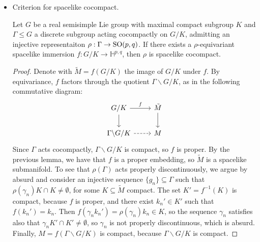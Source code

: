\documentclass{report}
\begin{document}
\begin{itemize}
\begin{lemma}
    \end{lemma}
    \item Criterion for spacelike cocompact.
    \begin{lemma}
        Let $G$ be a real semisimple Lie group with maximal compact subgroup $K$ and $\Gamma \leq G$ a discrete subgroup acting cocompactly on $G/K$, admitting an injective representaiton $\rho: \Gamma \to \operatorname{{\mathrm{SO}}}(p,q)$.
        If there exists a $\rho$-equivariant spacelike immersion $f: G/K \to \mathbb H^{p,q}$, then $\rho$ is spacelike cocompact.
    \end{lemma}
    \begin{proof}
        Denote with $\tilde M = f(G/K)$ the image of $G/K$ under $f$.
        By equivariance, $f$ factors through the quotient $\Gamma \backslash G/K$, as in the following commutative diagram:
        \[
        \begin{tikzcd}
            G/K \arrow[r, "f"] \arrow[d] &\tilde M \arrow[d] \\
            \Gamma \backslash G/K \arrow[r, dashed]  & M
        \end{tikzcd}
        \]
        Since $\Gamma$ acts cocompactly, $\Gamma \backslash G/K$ is compact, so $f$ is proper.
        By the previous lemma, we have that $f$ is a proper embedding, so $\tilde M$ is a spacelike submanifold.
        To see that $\rho(\Gamma)$ acts properly discontinuously, we argue by absurd and consider an injective sequence $\{g_n\} \subseteq \Gamma$ such that $\rho(\gamma_n)K \cap K \neq \emptyset$, for some $K \subseteq \tilde M$ compact.
        The set $K' = f^{-1}(K)$ is compact, because $f$ is proper, and there exist $k_n' \in K'$ such that $f(k_n') = k_n$.
        Then $f(\gamma_n k_n') = \rho(\gamma_n) k_n \in K$, so the sequence $\gamma_n$ satisfies also that $\gamma_n K' \cap K' \neq \emptyset$, so $\gamma_n$ is not properly discontinuous, which is absurd.
        Finally, $M = f(\Gamma \backslash G/K)$ is compact, because $\Gamma \backslash G/K$ is compact.
    \end{proof}
\end{itemize}
\end{document}
